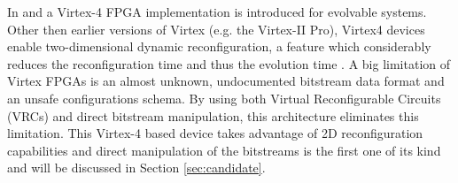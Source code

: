 \label{sec:virtex4}

In \cite{virtex4} and \cite{PDR} a Virtex-4 FPGA implementation is introduced for evolvable systems. Other then earlier versions of Virtex (e.g. the Virtex-II Pro), Virtex4 devices enable two-dimensional dynamic reconfiguration, a feature which considerably reduces the reconfiguration time and thus the evolution time \cite{virtex4}. A big limitation of Virtex FPGAs is an almost unknown, undocumented bitstream data format and an unsafe configurations schema. By using both Virtual Reconfigurable Circuits (VRCs) and direct bitstream manipulation, this architecture eliminates this limitation. This Virtex-4 based device takes advantage of 2D reconfiguration capabilities and direct manipulation of the bitstreams is the first one of its kind and will be discussed in Section \ref{sec:candidate}.